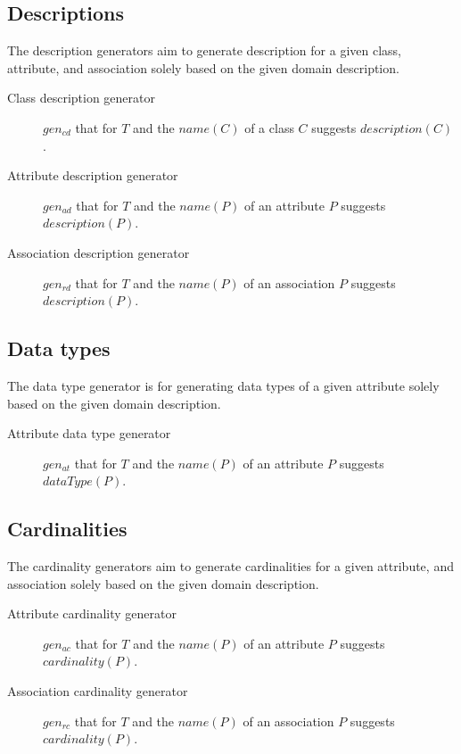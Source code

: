 \subsection{Descriptions}

The description generators aim to generate description for a given class, attribute, and association solely based on the given domain description.

\begin{description}
\item [Class description generator] $gen_{cd}$ that for $T$ and the $name(C)$ of a class $C$ suggests $description(C)$.

\item [Attribute description generator] $gen_{ad}$ that for $T$ and the $name(P)$ of an attribute $P$ suggests $description(P)$.

\item [Association description generator] $gen_{rd}$ that for $T$ and the $name(P)$ of an association $P$ suggests $description(P)$.
\end{description}


\subsection{Data types}

The data type generator is for generating data types of a given attribute solely based on the given domain description.

\begin{description}
\item [Attribute data type generator] $gen_{at}$ that for $T$ and the $name(P)$ of an attribute $P$ suggests $dataType(P)$.
\end{description}


\subsection{Cardinalities}

The cardinality generators aim to generate cardinalities for a given attribute, and association solely based on the given domain description.

\begin{description}
\item [Attribute cardinality generator] $gen_{ac}$ that for $T$ and the $name(P)$ of an attribute $P$ suggests $cardinality(P)$.

\item [Association cardinality generator] $gen_{rc}$ that for $T$ and the $name(P)$ of an association $P$ suggests $cardinality(P)$.
\end{description}


